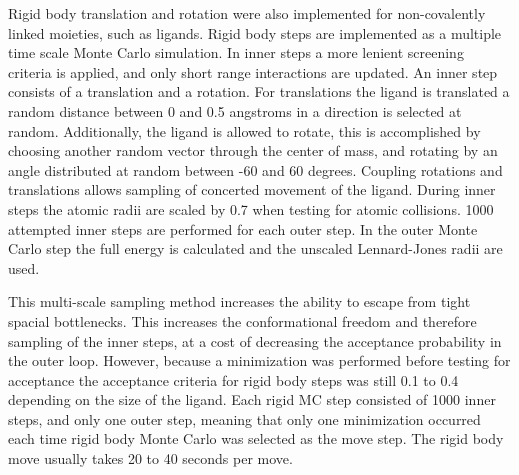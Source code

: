 Rigid body translation and rotation were also implemented for non-covalently linked moieties, such as ligands.
Rigid body steps are implemented as a multiple time scale Monte Carlo simulation.
In inner steps a more lenient screening criteria is applied, and only short range interactions are updated.
An inner step consists of a translation and a rotation.
For translations the ligand is translated a random distance between 0 and 0.5 angstroms in a direction is selected at random.
Additionally, the ligand is allowed to rotate, this is accomplished by choosing another random vector through the center of mass, and rotating by an angle distributed at random between -60 and 60 degrees.
Coupling rotations and translations allows sampling of concerted movement of the ligand.
During inner steps the atomic radii are scaled by 0.7 when testing for atomic collisions.
1000 attempted inner steps are performed for each outer step.
In the outer Monte Carlo step the full energy is calculated and the unscaled Lennard-Jones radii are used.

This multi-scale sampling method increases the ability to escape from tight spacial bottlenecks.
This increases the conformational freedom and therefore sampling of the inner steps, at a cost of decreasing the acceptance probability in the outer loop.
However, because a minimization was performed before testing for acceptance the acceptance criteria for rigid body steps was still 0.1 to 0.4 depending on the size of the ligand.
Each rigid MC step consisted of 1000 inner steps, and only one outer step, meaning that only one minimization occurred each time rigid body Monte Carlo was selected as the move step.
The rigid body move usually takes 20 to 40 seconds per move.

